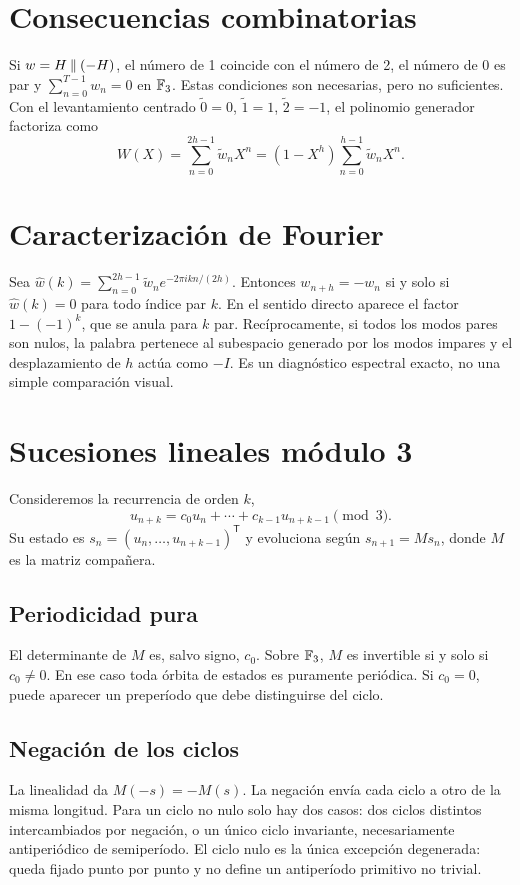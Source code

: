 \documentclass[11pt,a4paper]{article}
\begin{document}
\section{Consecuencias combinatorias}
Si \(w=H\mathbin{\Vert}(-H)\), el número de 1 coincide con el número de 2, el número de 0 es par y \(\sum_{n=0}^{T-1}w_n=0\) en \(\mathbb F_3\). Estas condiciones son necesarias, pero no suficientes. Con el levantamiento centrado \(\widetilde0=0\), \(\widetilde1=1\), \(\widetilde2=-1\), el polinomio generador factoriza como \[W(X)=\sum_{n=0}^{2h-1}\widetilde w_nX^n=(1-X^h)\sum_{n=0}^{h-1}\widetilde w_nX^n.\]
\section{Caracterización de Fourier}
Sea \(\widehat w(k)=\sum_{n=0}^{2h-1}\widetilde w_ne^{-2\pi i kn/(2h)}\). Entonces \(w_{n+h}=-w_n\) si y solo si \(\widehat w(k)=0\) para todo índice par \(k\). En el sentido directo aparece el factor \(1-(-1)^k\), que se anula para \(k\) par. Recíprocamente, si todos los modos pares son nulos, la palabra pertenece al subespacio generado por los modos impares y el desplazamiento de \(h\) actúa como \(-I\). Es un diagnóstico espectral exacto, no una simple comparación visual.
\section{Sucesiones lineales módulo 3}
Consideremos la recurrencia de orden \(k\), \[u_{n+k}=c_0u_n+\cdots+c_{k-1}u_{n+k-1}\pmod3.\] Su estado es \(s_n=(u_n,\ldots,u_{n+k-1})^{\mathsf T}\) y evoluciona según \(s_{n+1}=Ms_n\), donde \(M\) es la matriz compañera.
\subsection{Periodicidad pura}
El determinante de \(M\) es, salvo signo, \(c_0\). Sobre \(\mathbb F_3\), \(M\) es invertible si y solo si \(c_0\neq0\). En ese caso toda órbita de estados es puramente periódica. Si \(c_0=0\), puede aparecer un preperíodo que debe distinguirse del ciclo.
\subsection{Negación de los ciclos}
La linealidad da \(M(-s)=-M(s)\). La negación envía cada ciclo a otro de la misma longitud. Para un ciclo no nulo solo hay dos casos: dos ciclos distintos intercambiados por negación, o un único ciclo invariante, necesariamente antiperiódico de semiperíodo. El ciclo nulo es la única excepción degenerada: queda fijado punto por punto y no define un antiperíodo primitivo no trivial.
\end{document}
